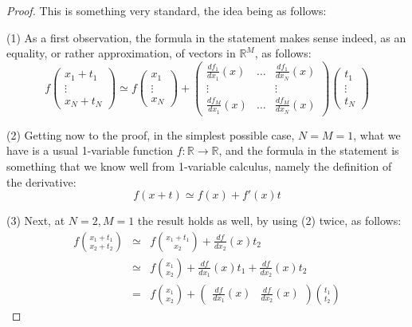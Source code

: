 \documentclass[12pt]{amsbook}
\begin{document}
\begin{proof}
This is something very standard, the idea being as follows:

\medskip

(1) As a first observation, the formula in the statement makes sense indeed, as an equality, or rather approximation, of vectors in $\mathbb R^M$, as follows:
$$f\begin{pmatrix}x_1+t_1\\ \vdots\\ x_N+t_N\end{pmatrix}
\simeq f\begin{pmatrix}x_1\\ \vdots\\ x_N\end{pmatrix}
+\begin{pmatrix}
\frac{df_1}{dx_1}(x)&\ldots&\frac{df_1}{dx_N}(x)\\
\vdots&&\vdots\\
\frac{df_M}{dx_1}(x)&\ldots&\frac{df_M}{dx_N}(x)
\end{pmatrix}\begin{pmatrix}t_1\\ \vdots\\ t_N\end{pmatrix}$$

(2) Getting now to the proof, in the simplest possible case, $N=M=1$, what we have is a usual 1-variable function $f:\mathbb R\to\mathbb R$, and the formula in the statement is something that we know well from 1-variable calculus, namely the definition of the derivative:
$$f(x+t)\simeq f(x)+f'(x)t$$

(3) Next, at $N=2,M=1$ the result holds as well, by using (2) twice, as follows:
\begin{eqnarray*}
f\binom{x_1+t_1}{x_2+t_2}
&\simeq&f\binom{x_1+t_1}{x_2}+\frac{df}{dx_2}(x)t_2\\
&\simeq&f\binom{x_1}{x_2}+\frac{df}{dx_1}(x)t_1+\frac{df}{dx_2}(x)t_2\\
&=&f\binom{x_1}{x_2}+\begin{pmatrix}\frac{df}{dx_1}(x)&\frac{df}{dx_2}(x)\end{pmatrix}\binom{t_1}{t_2}
\end{eqnarray*}


\end{proof}
\end{document}
